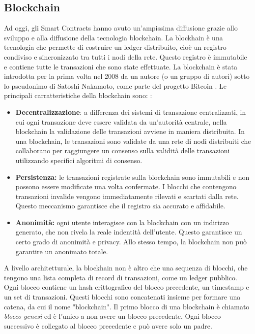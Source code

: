 \documentclass[../../Thesis.tex]{subfiles}
\begin{document}
\subsection{Blockchain}
Ad oggi, gli Smart Contracts hanno avuto un'ampissima diffusione grazie allo sviluppo  e alla diffusione della tecnologia blockchain. La blockhain è una tecnologia che permette di costruire un ledger distribuito, cioè un registro condiviso e sincronizzato tra tutti i nodi della rete. Questo registro è immutabile e contiene tutte le transazioni che sono state effettuate. La blockchain è stata introdotta per la prima volta nel 2008 da un autore (o un gruppo di autori) sotto lo pseudonimo di Satoshi Nakamoto, come parte del progetto Bitcoin \cite{Bitcoin}. Le principali carratteristiche della blockchain sono: \cite{Blockchain}:
\begin{itemize}
    \item \textbf{Decentralizzazione}: 
    a differenza dei sistemi di transazione centralizzati, in cui ogni transazione deve essere validata da un'autorità centrale, nella blockchain la validazione delle transazioni avviene in maniera distribuita. In una blockchain, le transazioni sono validate da una rete di nodi distribuiti che collaborano per raggiungere un consenso sulla validità delle transazioni utilizzando specifici algoritmi di consenso.
    \item \textbf{Persistenza:} 
    le transazioni registrate sulla blockchain sono immutabili e non possono essere modificate una volta confermate. I blocchi che contengono transazioni invalide vengono immediatamente rilevati e scartati dalla rete. Questo meccanismo garantisce che il registro sia accurato e affidabile.
    \item \textbf{Anonimità:} ogni utente interagisce con la blockchain con un indirizzo generato, che non rivela la reale indentità dell'utente. Questo garantisce un certo grado di anonimità e privacy. Allo stesso tempo, la blockchain non può garantire un anonimato totale. 
\end{itemize}
A livello architetturale, la blockhain non è altro che una sequenza di blocchi, che tengono una lista completa di record di transazioni, come un ledger pubblico. Ogni blocco contiene un hash crittografico del blocco precedente, un timestamp e un set di transazioni. Questi blocchi sono concatenati insieme per formare una catena, da cui il nome "blockchain". Il primo blocco di una blockchain è chiamato \emph{blocco genesi} ed è l'unico a non avere un blocco precedente. Ogni blocco successivo è collegato al blocco precedente e può avere solo un padre.\\
\end{document}
